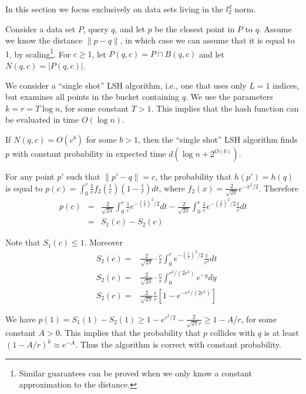 \documentclass[12pt]{article}
\begin{document}
In this section we focus exclusively on data sets living in the $l_2^d$ norm.

Consider a data set $P$, query $q$, and let $p$ be the closest point in $P$ to $q$.
Assume we know the distance $\|p-q\|$, in which case we can assume that it is equal to $1$, by scaling\footnote{Similar guarantees can be proved when we only know a constant approximation to the distance.}.
For $c \ge 1$, let $P(q,c)=P \cap B(q,c)$ and let $N(q,c)=|P(q,c)|$.


We consider a ``single shot'' LSH algorithm, i.e., one that uses only $L=1$ indices, but examines all points in the bucket containing $q$.
We use the parameters $k=r= T \log n$, for some constant $T>1$.
This implies that the hash function can be evaluated in time $O(\log n)$.

\begin{theorem}
If $N(q,c)=O(c^b)$ for some $b>1$, then the ``single shot'' LSH algorithm finds $p$ with constant probability in expected time $d (\log n + 2^{O(b)})$. 
\end{theorem}

 For any point $p'$ such that $\|p'-q\|=c$, 
the probability that $h(p')=h(q)$ is equal to $p(c)=\int_0^r \frac{1}{c}
f_2(\frac{t}{c}) (1-\frac{t}{r}) dt$, where $f_2(x)=\frac{2}{\sqrt{2 \pi}} e^{-x^2/2}$.
Therefore
\begin{eqnarray*}
p(c) & = &  \frac{2}{\sqrt{2 \pi}} \int_0^r \frac{1}{c} e^{-(\frac{t}{c})^2/2}  dt  -  \frac{2}{\sqrt{2 \pi}} \int_0^r \frac{1}{c} e^{-(\frac{t}{c})^2/2} \frac{t}{r} dt\\
&      = & S_1(c) - S_2(c)
\end{eqnarray*}

Note that $S_1(c) \le 1$. Moreover
\begin{eqnarray*}
&     S_2(c)=& \frac{2}{\sqrt{2 \pi}} \cdot \frac{c}{r} \int_0^r  e^{-(\frac{t}{c})^2/2} \frac{t}{c^2} dt\\
&     S_2(c) = & \frac{2}{\sqrt{2 \pi}} \cdot  \frac{c}{r} \int_0^{r^2/(2c^2)} e^{-y} dy\\
&     S_2(c) = & \frac{2}{\sqrt{2 \pi}}  \frac{c}{r} [1-e^{-r^2/(2c^2)}]
\end{eqnarray*}

We have $p(1)= S_1(1)-S_2(1) \ge 1-e^{r^2/2} -\frac{2}{\sqrt{2\pi}r} \ge 1-A/r$, for some constant $A>0$.
This implies that the probability that $p$ collides with $q$ is at least $(1-A/r)^k \approx e^{-A}$. 
Thus the algorithm is correct with constant probability.
\end{document}
